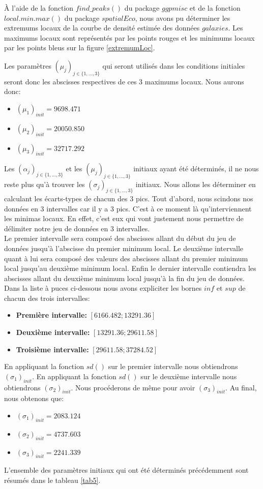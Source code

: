\documentclass[a4paper,french,10pt]{article}
\begin{document}
À l'aide de la fonction $find\_peaks()$ du package $ggpmisc$ et de la fonction $local.min.max()$ du package $spatialEco$, nous avons pu déterminer les extremums locaux de la courbe de densité estimée des données $galaxies$. Les maximums locaux sont représentés par les points rouges et les minimums locaux par les points bleus sur la figure \ref{extremumLoc}.

\newpage

Les paramètres $(\mu_j)_{j \in \{1,\dots,3\}}$ qui seront utilisés dans les conditions initiales seront donc les abscisses respectives de ces 3 maximums locaux. Nous aurons donc:
\begin{itemize}
	\item $(\mu_1)_{init} = 9698.471$
	\item $(\mu_2)_{init} = 20050.850$
	\item $(\mu_3)_{init} = 32717.292$
\end{itemize}

\vspace{2mm}

Les $(\alpha_j)_{j \in \{1,\dots,3\}}$ et les $(\mu_j)_{j \in \{1,\dots,3\}}$ initiaux ayant été déterminés, il ne nous reste plus qu'à trouver les $(\sigma_j)_{j \in \{1,\dots,3\}}$ initiaux. Nous allons les déterminer en calculant les écarts-types de chacun des 3 pics. Tout d'abord, nous scindons nos données en 3 intervalles car il y a 3 pics. C'est à ce moment là qu'interviennent les minimas locaux. En effet, c'est eux qui vont justement nous permettre de délimiter notre jeu de données en 3 intervalles. \\
Le premier intervalle sera composé des abscisses allant du début du jeu de données jusqu'à l'abscisse du premier minimum local. Le deuxième intervalle quant à lui sera composé des valeurs des abscisses allant du premier minimum local jusqu'au deuxième minimum local. Enfin le dernier intervalle contiendra les abscisses allant du deuxième minimum local jusqu'à la fin du jeu de données. Dans la liste à puces ci-dessous nous avons expliciter les bornes $inf$ et $sup$ de chacun des trois intervalles:
\begin{itemize}
	\item \textbf{Première intervalle:} $[6166.482; 13291.36]$
	\item \textbf{Deuxième intervalle:} $[13291.36; 29611.58]$
	\item \textbf{Troisième intervalle:} $[29611.58; 37284.52]$
\end{itemize}
En appliquant la fonction $sd()$ sur le premier intervalle nous obtiendrons $(\sigma_1)_{init}$. En appliquant la fonction $sd()$ sur le deuxième intervalle nous obtiendrons $(\sigma_2)_{init}$. Nous procéderons de même pour avoir $(\sigma_3)_{init}$. Au final, nous obtenons que:
\begin{itemize}
	\item $(\sigma_1)_{init} = 2083.124$
	\item $(\sigma_2)_{init} = 4737.603$
	\item $(\sigma_3)_{init} = 2241.339$
\end{itemize}
L'ensemble des paramètres initiaux qui ont été déterminés précédemment sont résumés dans le tableau \ref{tab5}.
\end{document}
